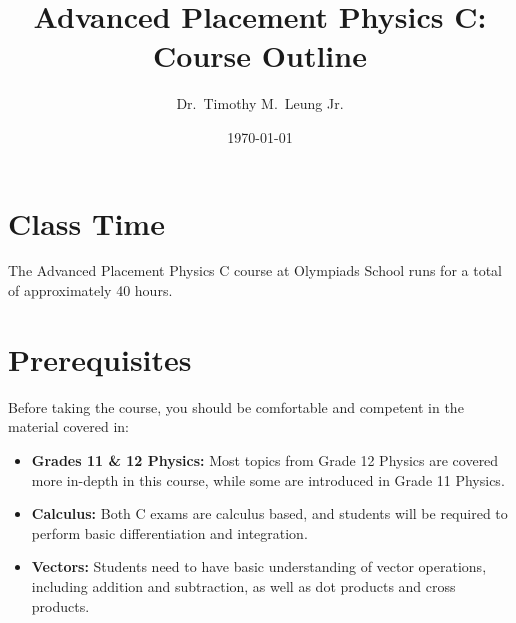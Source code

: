 \documentclass{../../oss-handout}
\title{Advanced Placement Physics C: Course Outline}
\author{Dr.\ Timothy M.\ Leung Jr.}
\date{\today}
\begin{document}
\thispagestyle{title}
\gentitle

\section*{Class Time}
The Advanced Placement Physics C course at Olympiads School runs for a total of
approximately 40 hours.

\section*{Prerequisites}
Before taking the course, you should be comfortable and competent in the
material covered in:
\begin{itemize}[nosep]
\item\textbf{Grades 11 \& 12 Physics:}
  Most topics from Grade 12 Physics are covered more in-depth in this course,
  while some are introduced in Grade 11 Physics.
\item\textbf{Calculus:} Both C exams are calculus based, and students will be
  required to perform basic differentiation and integration.
\item\textbf{Vectors:} Students need to have basic understanding of vector
  operations, including addition and subtraction, as well as dot products and
  cross products.
\end{itemize}
\end{document}
